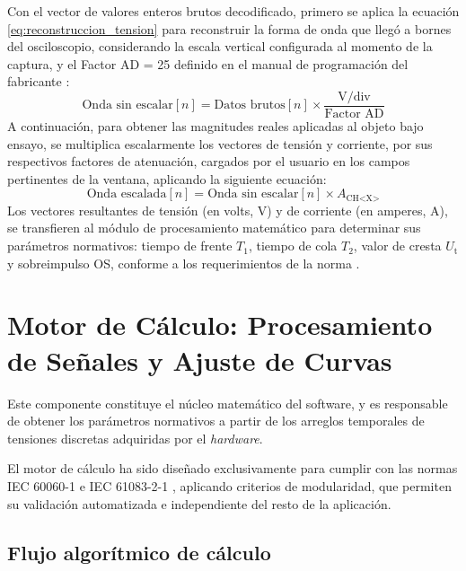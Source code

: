 Con el vector de valores enteros brutos decodificado, primero se aplica la ecuación \eqref{eq:reconstruccion_tension} para reconstruir la forma de onda que llegó a bornes del osciloscopio, considerando la escala vertical configurada al momento de la captura, y el Factor AD = \num{25} definido en el manual de programación del fabricante \cite{gds1000au_ProgrammingManual}:
\begin{equation}
\label{eq:reconstruccion_tension}
\text{Onda sin escalar}[n] = \text{Datos brutos}[n] \times \frac{{\text{V/div}}}{\text{Factor AD}}
\end{equation}
A continuación, para obtener las magnitudes reales aplicadas al objeto bajo ensayo, se multiplica escalarmente los vectores de tensión y corriente, por sus respectivos factores de atenuación, cargados por el usuario en los campos pertinentes de la ventana, aplicando la siguiente ecuación:
\begin{equation}
\label{eq:reconstruccion_tension_total}
{\text{Onda escalada}}[n] = \text{Onda sin escalar}[n] \times A_{\text{CH<X>}}
\end{equation}
Los vectores resultantes de tensión (en volts, \unit{\volt}) y de corriente (en amperes, \unit{\ampere}), se transfieren al módulo de procesamiento matemático para determinar sus parámetros normativos: tiempo de frente $T_1$, tiempo de cola $T_2$, valor de cresta $U_{\text{t}}$ y sobreimpulso OS, conforme a los requerimientos de la norma \cite{iec60060_1}.

\section{Motor de Cálculo: Procesamiento de Señales y Ajuste de Curvas}
\label{sec:motor_calculo}

Este componente constituye el núcleo matemático del software, y es responsable de obtener los parámetros normativos a partir de los arreglos temporales de tensiones discretas adquiridas por el \emph{hardware}.

El motor de cálculo ha sido diseñado exclusivamente para cumplir con las normas IEC 60060-1 \cite{iec60060_1} e IEC 61083-2-1 \cite{iec61083_2}, aplicando criterios de modularidad, que permiten su validación automatizada e independiente del resto de la aplicación.

\subsection{Flujo algorítmico de cálculo}
\label{sec:flujo_algoritmico}

